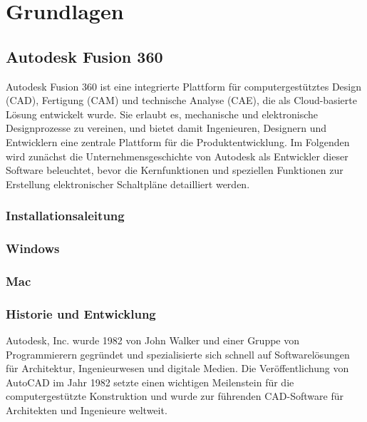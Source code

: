 \chapter{Grundlagen}
\label{cha:Grundlagen}
\section{Autodesk Fusion 360}
\label{Autodesk}
Autodesk Fusion 360 ist eine integrierte Plattform für computergestütztes Design (CAD), Fertigung (CAM) und technische Analyse (CAE), die als Cloud-basierte Lösung entwickelt wurde. Sie erlaubt es, mechanische und elektronische Designprozesse zu vereinen, und bietet damit Ingenieuren, Designern und Entwicklern eine zentrale Plattform für die Produktentwicklung. Im Folgenden wird zunächst die Unternehmensgeschichte von Autodesk als Entwickler dieser Software beleuchtet, bevor die Kernfunktionen und speziellen Funktionen zur Erstellung elektronischer Schaltpläne detailliert werden.
\subsection{Installationsaleitung}
\subsection*{Windows}
\subsection*{Mac}
\subsection{Historie und Entwicklung}
Autodesk, Inc. wurde 1982 von John Walker und einer Gruppe von Programmierern gegründet und spezialisierte sich schnell auf Softwarelösungen für Architektur, Ingenieurwesen und digitale Medien. 
Die Veröffentlichung von AutoCAD im Jahr 1982 setzte einen wichtigen Meilenstein für die computergestützte Konstruktion und wurde zur führenden CAD-Software für Architekten und Ingenieure weltweit.


